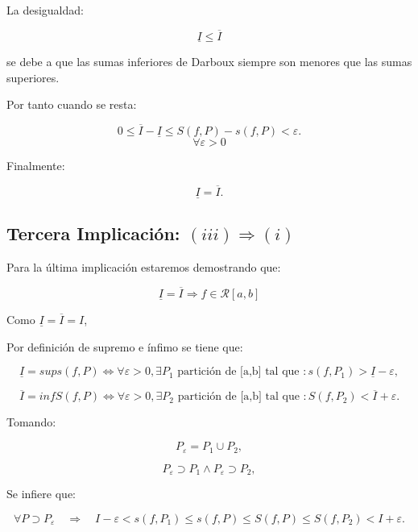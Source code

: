 \documentclass[a4paper,12pt]{article}
\begin{document}
	La desigualdad:
	
	\[
	 \underline{I} \leq \overline{I}
	\]
	
	se debe a que las sumas inferiores de Darboux siempre son menores que las sumas superiores.
	
	
	Por tanto cuando se resta:
	
	
	
	\[
	0 \leq \overline{I} - \underline{I} \leq S(f, P) - s(f, P) < \varepsilon.
	\] \[\forall \varepsilon > 0\]
	
	
	
	Finalmente:
	
	
	
	\[
	\underline{I} = \overline{I}.
	\]
	
	
	
	\subsection{Tercera Implicación: $ (iii) \Rightarrow (i) $ } 
	
	
	Para la última implicación estaremos demostrando que:
	
	\[
	\underline{I} = \overline{I} \Rightarrow f \in \mathcal{R}[a,b]
	\]
	
	Como \( \underline{I} = \overline{I} = I \), 
	
	Por definición de supremo e ínfimo se tiene que:
	
	\[
	\underline{I} = sup s(f,P) \Longleftrightarrow \forall \varepsilon > 0, \exists P_1 \text{ partición de [a,b] tal que } : s(f, P_1) > \underline{I} - \varepsilon,
	\]
	
	\[
	\overline{I} = inf S(f,P) \Longleftrightarrow \forall \varepsilon > 0, \exists P_2\text{ partición de [a,b] tal que } : S(f, P_2) < \overline{I} + \varepsilon.
	\]
	
	
	
	Tomando:
	
	
	
	\[
	P_\varepsilon = P_1 \cup P_2,
	\]
	
	
	
	
	
	\[
	P_\varepsilon \supset P_1 \land P_\varepsilon \supset P_2,
	\]
	
	
	
	Se infiere que:
	
	
	
	\[
	\forall P \supset P_\varepsilon \quad \Rightarrow \quad I - \varepsilon < s(f, P_1) \leq s(f, P) \leq S(f,P) \leq S(f, P_2) < I + \varepsilon.
	\]
	
\end{document}
